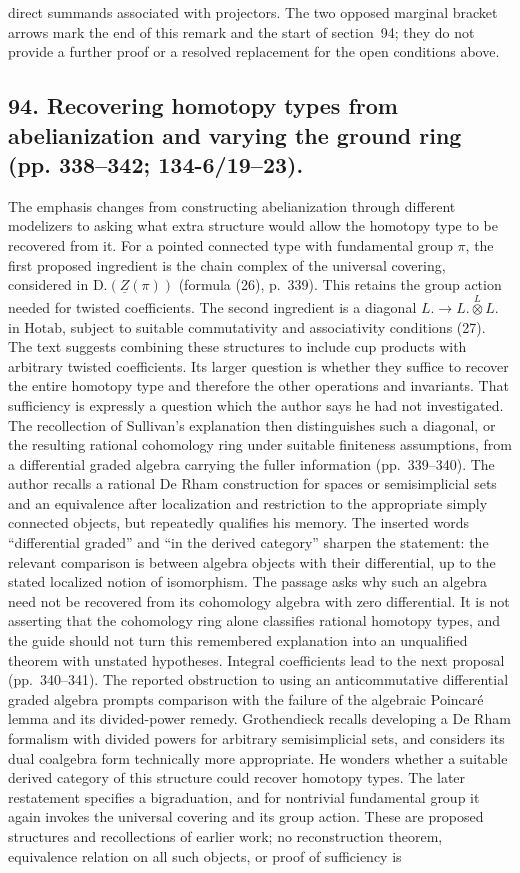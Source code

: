 \documentclass[10pt,oneside]{book}
\begin{document}
direct summands associated with projectors. The two opposed marginal bracket arrows mark the end of this remark and the start of section~94; they do not provide a further proof or a resolved replacement for the open conditions above.

\subsection*{94. Recovering homotopy types from abelianization and varying the ground ring (pp. 338--342; 134-6/19--23).}
The emphasis changes from constructing abelianization through different modelizers to asking what extra structure would allow the homotopy type to be recovered from it. For a pointed connected type with fundamental group $\pi$, the first proposed ingredient is the chain complex of the universal covering, considered in $\mathrm{D.}(\underline Z(\pi))$ (formula (26), p.~339). This retains the group action needed for twisted coefficients. The second ingredient is a diagonal $L.\to L.\overset{L}{\otimes}L.$ in $\mathrm{Hotab}$, subject to suitable commutativity and associativity conditions (27). The text suggests combining these structures to include cup products with arbitrary twisted coefficients. Its larger question is whether they suffice to recover the entire homotopy type and therefore the other operations and invariants. That sufficiency is expressly a question which the author says he had not investigated. The recollection of Sullivan's explanation then distinguishes such a diagonal, or the resulting rational cohomology ring under suitable finiteness assumptions, from a differential graded algebra carrying the fuller information (pp.~339--340). The author recalls a rational De Rham construction for spaces or semisimplicial sets and an equivalence after localization and restriction to the appropriate simply connected objects, but repeatedly qualifies his memory. The inserted words ``differential graded'' and ``in the derived category'' sharpen the statement: the relevant comparison is between algebra objects with their differential, up to the stated localized notion of isomorphism. The passage asks why such an algebra need not be recovered from its cohomology algebra with zero differential. It is not asserting that the cohomology ring alone classifies rational homotopy types, and the guide should not turn this remembered explanation into an unqualified theorem with unstated hypotheses. Integral coefficients lead to the next proposal (pp.~340--341). The reported obstruction to using an anticommutative differential graded algebra prompts comparison with the failure of the algebraic Poincar\'e lemma and its divided-power remedy. Grothendieck recalls developing a De Rham formalism with divided powers for arbitrary semisimplicial sets, and considers its dual coalgebra form technically more appropriate. He wonders whether a suitable derived category of this structure could recover homotopy types. The later restatement specifies a bigraduation, and for nontrivial fundamental group it again invokes the universal covering and its group action. These are proposed structures and recollections of earlier work; no reconstruction theorem, equivalence relation on all such objects, or proof of sufficiency is 
\end{document}
